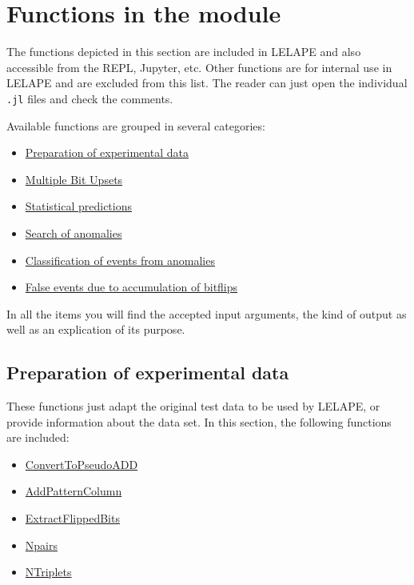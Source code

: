  \section{Functions in the module}\label{Sec:FunctionsintheModule}
 The functions depicted in this section are included in LELAPE and also accessible from the REPL, Jupyter, etc. Other functions are for internal use in LELAPE and are excluded from this list. The reader can just open the individual \texttt{.jl} files and check the comments.
 
 Available functions are grouped in several categories:
 
 \begin{itemize}
 	\item \hyperref[SubseC:PreparationExpdata]{Preparation of experimental data}
 	\item \hyperref[SubSeC:MBUs]{Multiple Bit Upsets}
 	\item \hyperref[Subsec:StatisticalPredictions]{Statistical predictions}
 	\item \hyperref[Subsec:SearchOfAnomalies]{Search of anomalies}
 	\item \hyperref [SubSec:ClassificationEventsFromAnomalies]{Classification of events from anomalies}
 	\item \hyperref[SubSec:FalseEvents]{False events due to accumulation of bitflips}
 \end{itemize}
 In all the items you will find the accepted input arguments, the kind of output as well as an explication of its purpose.
 \subsection{Preparation of experimental data}\label{SubseC:PreparationExpdata}
 These functions just adapt the original test data to be used by LELAPE, or provide information about the data set. In this section, the following functions are included:
 \begin{itemize}
 	\item \hyperref[Func:ConvertToPseudoADD]{ConvertToPseudoADD}
 	\item \hyperref[Func:AddPatternColumn]{AddPatternColumn}
 	\item \hyperref[Func:ExtractFlippedBits]{ExtractFlippedBits}
 	\item \hyperref[Func:Npairs]{Npairs}
 	\item \hyperref[Func:NTriplets]{NTriplets}
 \end{itemize}
